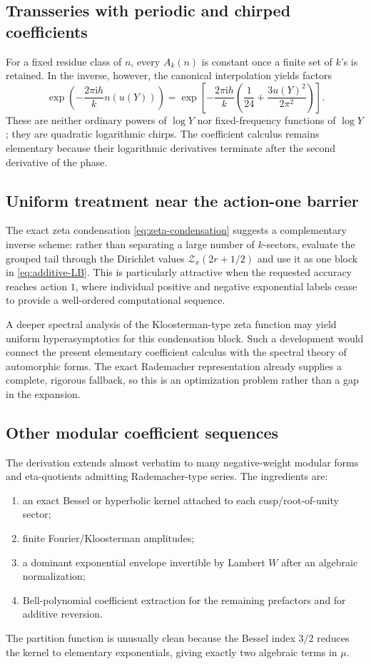 \documentclass[11pt]{article}
\numberwithin{equation}{section}
\theoremstyle{mainthm}
\theoremstyle{defstyle}
\theoremstyle{remark}
\newcommand{\ii}{\mathrm i}
\newcommand{\Zrad}{\mathcal Z}
\begin{document}
\subsection{Transseries with periodic and chirped coefficients}

For a fixed residue class of \(n\), every \(A_k(n)\) is constant once a finite set of \(k\)'s is retained.  In the inverse, however, the canonical interpolation yields factors
\[
 \exp\!\left(-\frac{2\pi\ii h}{k}n(u(Y))\right)
 =\exp\!\left[-\frac{2\pi\ii h}{k}
 \left(\frac1{24}+\frac{3u(Y)^2}{2\pi^2}\right)\right].
\]
These are neither ordinary powers of \(\log Y\) nor fixed-frequency functions of \(\log Y\); they are quadratic logarithmic chirps.  The coefficient calculus remains elementary because their logarithmic derivatives terminate after the second derivative of the phase.

\subsection{Uniform treatment near the action-one barrier}

The exact zeta condensation \eqref{eq:zeta-condensation} suggests a complementary inverse scheme: rather than separating a large number of \(k\)-sectors, evaluate the grouped tail through the Dirichlet values \(\Zrad_x(2r+1/2)\) and use it as one block in \eqref{eq:additive-LB}.  This is particularly attractive when the requested accuracy reaches action \(1\), where individual positive and negative exponential labels cease to provide a well-ordered computational sequence.

A deeper spectral analysis of the Kloosterman-type zeta function may yield uniform hyperasymptotics for this condensation block.  Such a development would connect the present elementary coefficient calculus with the spectral theory of automorphic forms.  The exact Rademacher representation already supplies a complete, rigorous fallback, so this is an optimization problem rather than a gap in the expansion.

\subsection{Other modular coefficient sequences}

The derivation extends almost verbatim to many negative-weight modular forms and eta-quotients admitting Rademacher-type series.  The ingredients are:
\begin{enumerate}
\item an exact Bessel or hyperbolic kernel attached to each cusp/root-of-unity sector;
\item finite Fourier/Kloosterman amplitudes;
\item a dominant exponential envelope invertible by Lambert \(W\) after an algebraic normalization;
\item Bell-polynomial coefficient extraction for the remaining prefactors and for additive reversion.
\end{enumerate}
The partition function is unusually clean because the Bessel index \(3/2\) reduces the kernel to elementary exponentials, giving exactly two algebraic terms in \(\mu\).
\end{document}
